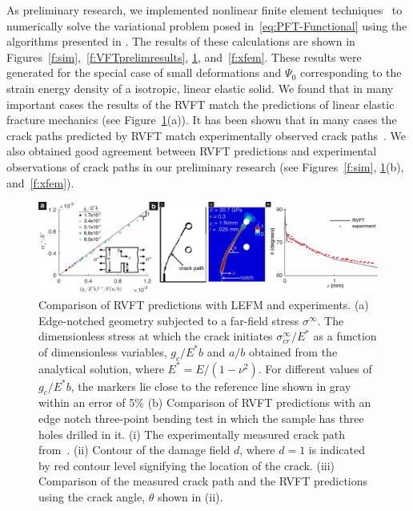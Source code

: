 \documentclass[10pt,letterpaper]{article}
\begin{document}
    As preliminary research, we implemented nonlinear finite element techniques~\cite{belytschko2013nonlinear} to numerically solve the variational problem posed in~\eqref{eq:PFT-Functional} using the algorithms presented in \cite{borden2012phase}. The results of these calculations are shown in Figures~\ref{f:sim},~\ref{f:VFTprelimresults}, \ref{f:VFTvalidation}, and~\ref{f:xfem}. These results were generated for the special case of small deformations and $\Psi_0$ corresponding to the strain energy density of a  isotropic, linear elastic solid. We found that in many important cases the results of the RVFT match the predictions of linear elastic fracture mechanics (see Figure~\ref{f:VFTvalidation}(a)). It has  been shown that in many cases the crack paths predicted by RVFT match experimentally observed crack paths~\cite{miehe2010phase,borden2012phase,dally2015phase}. We also obtained good agreement between RVFT predictions and experimental observations of crack paths in our preliminary research (see Figures~\ref{f:sim}, \ref{f:VFTvalidation}(b), and~\ref{f:xfem}).
%
    \begin{figure}[h!]
      \centering
      \includegraphics[width=\textwidth]{Figures/VRF/Figure1_box_ver9.pdf}
      \caption{\footnotesize Comparison of RVFT predictions with LEFM and experiments. (a) Edge-notched geometry subjected to a far-field stress $\sigma^\infty$. The dimensionless stress at which the crack initiates $\sigma^\infty_{cr}/E^*$ as a function of dimensionless variables, $g_c/E^*b$ and $a/b$ obtained from the analytical solution, where $E^*=E/(1-\nu^2)$. For different values of $g_c/E^*b$, the markers lie close to the reference line shown in gray within an error of 5\% (b) Comparison of RVFT predictions with an edge notch three-point bending test in which the sample has three holes drilled in it. (i) The experimentally measured crack path from~\cite{bittencourt_1996}. (ii) Contour of the damage field $d$, where $d=1$ is indicated by red contour level signifying the location of the crack. (iii) Comparison of the measured crack path and the RVFT predictions using the crack angle, $\theta$ shown in (ii).}
      \label{f:VFTvalidation}
    \end{figure}
\end{document}
